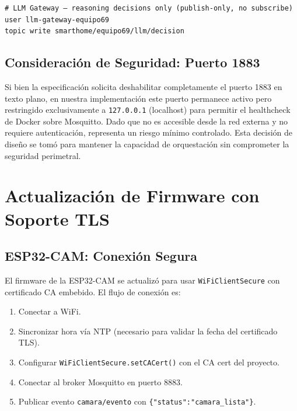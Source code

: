 \documentclass[12pt,letterpaper]{article}
\begin{document}
\begin{lstlisting}[language={}, label=lst:acl_llm, caption={Extracto de \mbox{\texttt{acl.conf}} mostrando las restricciones del LLM Gateway.}]
# LLM Gateway — reasoning decisions only (publish-only, no subscribe)
user llm-gateway-equipo69
topic write smarthome/equipo69/llm/decision
\end{lstlisting}

\subsection{Consideración de Seguridad: Puerto 1883}

Si bien la especificación solicita deshabilitar completamente el puerto 1883 en texto plano, en nuestra implementación este puerto permanece activo pero restringido exclusivamente a \mbox{\texttt{127.0.0.1}} (localhost) para permitir el healthcheck de Docker sobre Mosquitto. Dado que no es accesible desde la red externa y no requiere autenticación, representa un riesgo mínimo controlado. Esta decisión de diseño se tomó para mantener la capacidad de orquestación sin comprometer la seguridad perimetral.

\newpage

\section{Actualización de Firmware con Soporte TLS}

\subsection{ESP32-CAM: Conexión Segura}

El firmware de la ESP32-CAM se actualizó para usar \mbox{\texttt{WiFiClientSecure}} con certificado CA embebido. El flujo de conexión es:

\begin{enumerate}
    \item Conectar a WiFi.
    \item Sincronizar hora vía NTP (necesario para validar la fecha del certificado TLS).
    \item Configurar \mbox{\texttt{WiFiClientSecure.setCACert()}} con el CA cert del proyecto.
    \item Conectar al broker Mosquitto en puerto 8883.
    \item Publicar evento \mbox{\texttt{camara/evento}} con \texttt{\{"status":"camara\_lista"\}}.
\end{enumerate}
\end{document}
